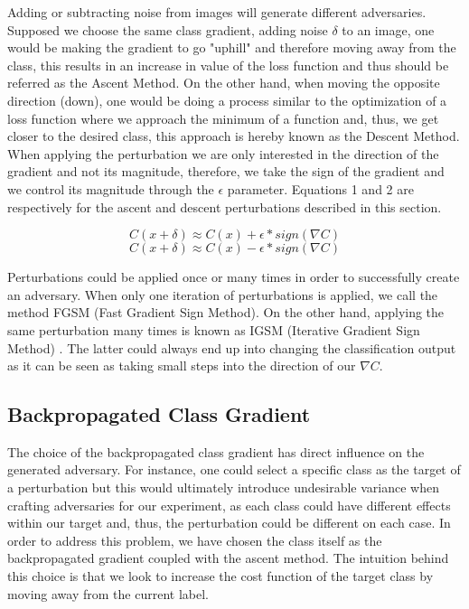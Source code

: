 \documentclass[runningheads,a4paper]{llncs}
\begin{document}
Adding or subtracting noise  from images will generate different adversaries. Supposed we choose the same class gradient, adding noise $\delta$ to an image, one would be making the gradient to go "uphill" and therefore moving away from the class, this results in an increase in value of the loss function and thus should be referred as the Ascent Method. On the other hand, when moving the opposite direction (down), one would be doing a process similar to the optimization of a loss function where we approach the minimum of a function and, thus, we get closer to the desired class, this approach is hereby known as the Descent Method. When applying the perturbation we are only interested in the direction of the gradient and not its magnitude, therefore, we take the sign of the gradient and we control its magnitude through the $\epsilon$ parameter. Equations 1 and 2 are respectively for the ascent and descent perturbations described in this section.

\begin{equation}
C(x + \delta)\approx C(x) + \epsilon * sign(\nabla C)
\end{equation}
\begin{equation}
C(x + \delta)\approx C(x) - \epsilon * sign(\nabla C)
\end{equation}

Perturbations could be applied once or many times in order to successfully create an adversary. When only one iteration of perturbations is applied, we call the method FGSM (Fast Gradient Sign Method). On the other hand, applying the same perturbation many times is known as IGSM (Iterative Gradient Sign Method) \cite{goodfellow2014}. The latter could always end up into changing the classification output as it can be seen as taking small steps into the direction of our $\nabla C$. 
\subsection{Backpropagated Class Gradient}

The choice of the backpropagated class gradient has direct influence on the generated adversary. For instance, one could select a specific class as the target of a perturbation but this would ultimately introduce undesirable variance when crafting adversaries for our experiment, as each class could have different effects within our target and, thus, the perturbation could be different on each case. In order to address this problem, we have chosen the class itself as the backpropagated gradient coupled with the ascent method. The intuition behind this choice is that we look to increase the cost function of the target class by moving away from the current label.
\end{document}
